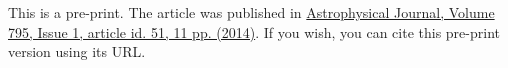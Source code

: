 \LARGE
This is a pre-print. The article was published in \href{http://iopscience.iop.org/article/10.1088/0004-637X/795/1/51/}{Astrophysical Journal, Volume 795, Issue 1, article id. 51, 11 pp. (2014)}. If you wish, you can cite this pre-print version using its URL.

\normalsize